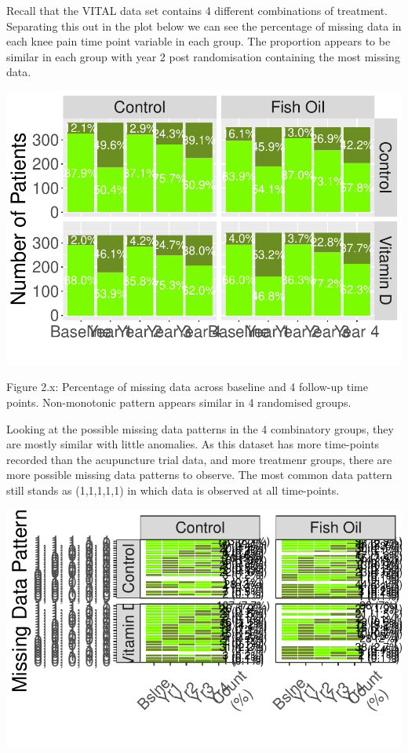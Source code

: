\documentclass{article}
\newcommand{\pandocbounded}[1]{#1}
\begin{document}
Recall that the VITAL data set contains 4 different combinations of
treatment. Separating this out in the plot below we can see the
percentage of missing data in each knee pain time point variable in each
group. The proportion appears to be similar in each group with year 2
post randomisation containing the most missing data.

\pandocbounded{\includegraphics[keepaspectratio]{Final_Report_files/figure-latex/unnamed-chunk-23-1.pdf}}

Figure 2.x: Percentage of missing data across baseline and 4 follow-up
time points. Non-monotonic pattern appears similar in 4 randomised
groups.

Looking at the possible missing data patterns in the 4 combinatory
groups, they are mostly similar with little anomalies. As this dataset
has more time-points recorded than the acupuncture trial data, and more
treatmenr groups, there are more possible missing data patterns to
observe. The most common data pattern still stands as (1,1,1,1,1) in
which data is observed at all time-points.

\pandocbounded{\includegraphics[keepaspectratio]{Final_Report_files/figure-latex/unnamed-chunk-24-1.pdf}}
\end{document}
